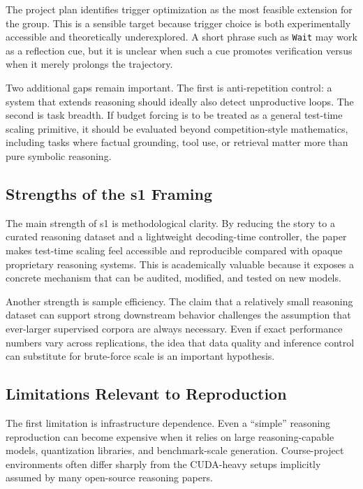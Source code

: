 The project plan identifies trigger optimization as the most feasible extension for the group. This is a sensible target because trigger choice is both experimentally accessible and theoretically underexplored. A short phrase such as \texttt{Wait} may work as a reflection cue, but it is unclear when such a cue promotes verification versus when it merely prolongs the trajectory.

Two additional gaps remain important. The first is anti-repetition control: a system that extends reasoning should ideally also detect unproductive loops. The second is task breadth. If budget forcing is to be treated as a general test-time scaling primitive, it should be evaluated beyond competition-style mathematics, including tasks where factual grounding, tool use, or retrieval matter more than pure symbolic reasoning.
\label{sec:analysis}

\subsection{Strengths of the s1 Framing}

The main strength of s1 is methodological clarity. By reducing the story to a curated reasoning dataset and a lightweight decoding-time controller, the paper makes test-time scaling feel accessible and reproducible compared with opaque proprietary reasoning systems. This is academically valuable because it exposes a concrete mechanism that can be audited, modified, and tested on new models.

Another strength is sample efficiency. The claim that a relatively small reasoning dataset can support strong downstream behavior challenges the assumption that ever-larger supervised corpora are always necessary. Even if exact performance numbers vary across replications, the idea that data quality and inference control can substitute for brute-force scale is an important hypothesis.

\subsection{Limitations Relevant to Reproduction}

The first limitation is infrastructure dependence. Even a ``simple'' reasoning reproduction can become expensive when it relies on large reasoning-capable models, quantization libraries, and benchmark-scale generation. Course-project environments often differ sharply from the CUDA-heavy setups implicitly assumed by many open-source reasoning papers.


